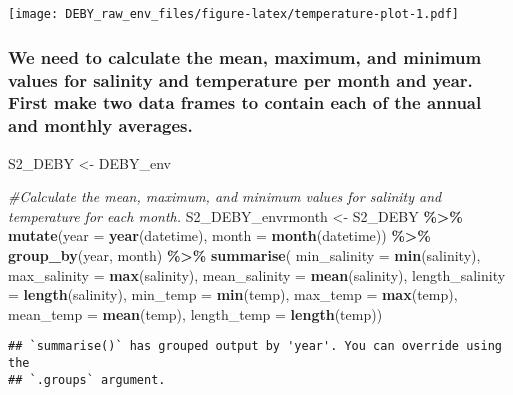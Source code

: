 \documentclass[
]{article}
\newenvironment{Shaded}{\begin{snugshade}}{\end{snugshade}}
\newcommand{\AttributeTok}[1]{\textcolor[rgb]{0.13,0.29,0.53}{#1}}
\newcommand{\CommentTok}[1]{\textcolor[rgb]{0.56,0.35,0.01}{\textit{#1}}}
\newcommand{\FunctionTok}[1]{\textcolor[rgb]{0.13,0.29,0.53}{\textbf{#1}}}
\newcommand{\NormalTok}[1]{#1}
\newcommand{\OtherTok}[1]{\textcolor[rgb]{0.56,0.35,0.01}{#1}}
\newcommand{\SpecialCharTok}[1]{\textcolor[rgb]{0.81,0.36,0.00}{\textbf{#1}}}
\begin{document}
\texttt{[image: DEBY\_raw\_env\_files/figure-latex/temperature-plot-1.pdf]}

\hypertarget{we-need-to-calculate-the-mean-maximum-and-minimum-values-for-salinity-and-temperature-per-month-and-year.-first-make-two-data-frames-to-contain-each-of-the-annual-and-monthly-averages.}{%
\subsubsection{We need to calculate the mean, maximum, and minimum
values for salinity and temperature per month and year. First make two
data frames to contain each of the annual and monthly
averages.}\label{we-need-to-calculate-the-mean-maximum-and-minimum-values-for-salinity-and-temperature-per-month-and-year.-first-make-two-data-frames-to-contain-each-of-the-annual-and-monthly-averages.}}

\begin{Shaded}
\begin{Highlighting}[]
\NormalTok{S2\_DEBY }\OtherTok{\textless{}{-}}\NormalTok{ DEBY\_env}

\CommentTok{\#Calculate the mean, maximum, and minimum values for salinity and temperature for each month. }
\NormalTok{S2\_DEBY\_envrmonth }\OtherTok{\textless{}{-}}\NormalTok{ S2\_DEBY }\SpecialCharTok{\%\textgreater{}\%}
    \FunctionTok{mutate}\NormalTok{(}\AttributeTok{year =} \FunctionTok{year}\NormalTok{(datetime), }\AttributeTok{month =} \FunctionTok{month}\NormalTok{(datetime)) }\SpecialCharTok{\%\textgreater{}\%}
    \FunctionTok{group\_by}\NormalTok{(year, month) }\SpecialCharTok{\%\textgreater{}\%}
    \FunctionTok{summarise}\NormalTok{(}
      \AttributeTok{min\_salinity =} \FunctionTok{min}\NormalTok{(salinity),}
      \AttributeTok{max\_salinity =} \FunctionTok{max}\NormalTok{(salinity),}
      \AttributeTok{mean\_salinity =} \FunctionTok{mean}\NormalTok{(salinity),}
      \AttributeTok{length\_salinity =} \FunctionTok{length}\NormalTok{(salinity),}
      \AttributeTok{min\_temp =} \FunctionTok{min}\NormalTok{(temp),}
      \AttributeTok{max\_temp =} \FunctionTok{max}\NormalTok{(temp),}
      \AttributeTok{mean\_temp =} \FunctionTok{mean}\NormalTok{(temp),}
      \AttributeTok{length\_temp =} \FunctionTok{length}\NormalTok{(temp))}
\end{Highlighting}
\end{Shaded}

\begin{verbatim}
## `summarise()` has grouped output by 'year'. You can override using the
## `.groups` argument.
\end{verbatim}
\end{document}
